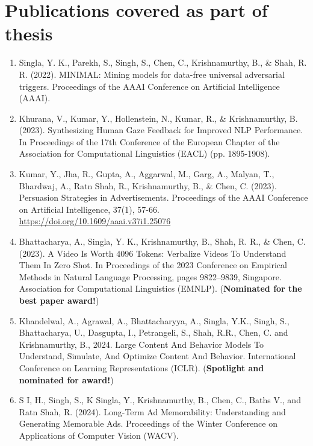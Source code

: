 \chapter*{Publications covered as part of thesis}
\begin{enumerate}
    \item Singla, Y. K., Parekh, S., Singh, S., Chen, C., Krishnamurthy, B., \& Shah, R. R. (2022). MINIMAL: Mining models for data-free universal adversarial triggers. Proceedings of the AAAI Conference on Artificial Intelligence (AAAI).

    \item Khurana, V., Kumar, Y., Hollenstein, N., Kumar, R., \& Krishnamurthy, B. (2023). Synthesizing Human Gaze Feedback for Improved NLP Performance. In Proceedings of the 17th Conference of the European Chapter of the Association for Computational Linguistics (EACL) (pp. 1895-1908).
    
    \item Kumar, Y., Jha, R., Gupta, A., Aggarwal, M., Garg, A., Malyan, T., Bhardwaj, A., Ratn Shah, R., Krishnamurthy, B., \& Chen, C. (2023). Persuasion Strategies in Advertisements. Proceedings of the AAAI Conference on Artificial Intelligence, 37(1), 57-66. \url{https://doi.org/10.1609/aaai.v37i1.25076}

    \item Bhattacharya, A., Singla, Y. K., Krishnamurthy, B., Shah, R. R., \& Chen, C. (2023). A Video Is Worth 4096 Tokens: Verbalize Videos To Understand Them In Zero Shot. In Proceedings of the 2023 Conference on Empirical Methods in Natural Language Processing, pages 9822–9839, Singapore. Association for Computational Linguistics (EMNLP). (\textbf{Nominated for the best paper award!})

    \item Khandelwal, A., Agrawal, A., Bhattacharyya, A., Singla, Y.K., Singh, S., Bhattacharya, U., Dasgupta, I., Petrangeli, S., Shah, R.R., Chen, C. and Krishnamurthy, B., 2024. Large Content And Behavior Models To Understand, Simulate, And Optimize Content And Behavior. International Conference on Learning Representations (ICLR). (\textbf{Spotlight and nominated for award!})

    \item  S I, H., Singh, S., K Singla, Y., Krishnamurthy, B., Chen, C., Baths V., and Ratn Shah, R. (2024). Long-Term Ad Memorability: Understanding and Generating Memorable Ads. Proceedings of the Winter Conference on Applications of Computer Vision (WACV).


\end{enumerate}

